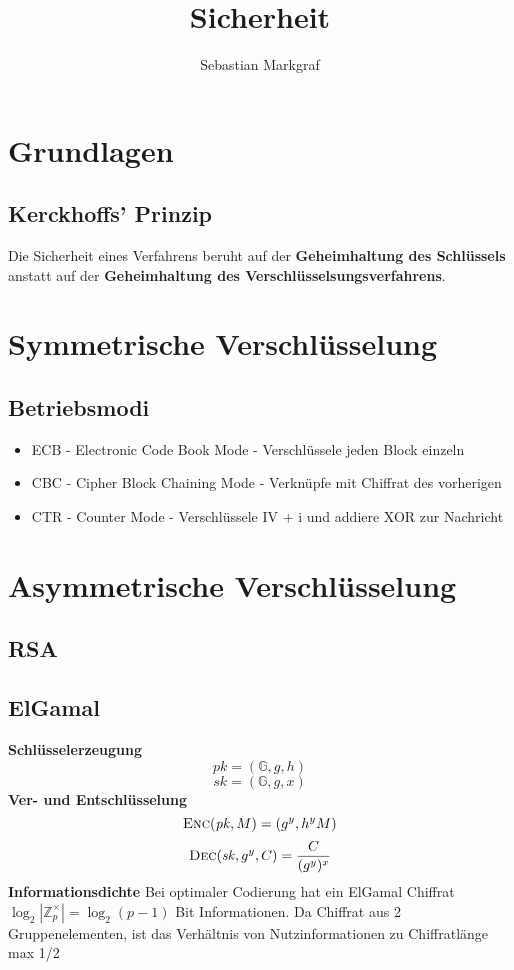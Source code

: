 \documentclass[10pt,a4paper]{article}
\author{Sebastian Markgraf}
\title{Sicherheit}
\begin{document}
	{\let\newpage\relax\maketitle}
	\tableofcontents
	\newpage
	\setcounter{page}{1}

        \section{Grundlagen}
        \subsection{Kerckhoffs' Prinzip}
        Die Sicherheit eines Verfahrens beruht auf der \textbf{Geheimhaltung des Schlüssels}
        anstatt auf der \textbf{Geheimhaltung des Verschlüsselsungsverfahrens}.
        
	\section{Symmetrische Verschlüsselung}
        \subsection{Betriebsmodi}
        \begin{itemize}
        \item ECB - Electronic Code Book Mode - Verschlüssele jeden Block einzeln
        \item CBC - Cipher Block Chaining Mode - Verknüpfe mit Chiffrat des vorherigen
        \item CTR - Counter Mode - Verschlüssele IV + i und addiere XOR zur Nachricht
        \end{itemize}

        \section{Asymmetrische Verschlüsselung}
        \subsection{RSA}
        \subsection{ElGamal}
        \textbf{Schlüsselerzeugung}
        \[\mathit{pk} = (\mathbb{G},g,h)\]
        \[\mathit{sk} = (\mathbb{G},g,x)\]
        \textbf{Ver- und Entschlüsselung}
        \[\textsc{Enc}(\mathit{pk}, M) = (g^y, h^yM)\]
        \[\textsc{Dec}(\mathit{sk}, g^y, C) = \frac{C}{(g^y)^x}\]
        \textbf{Informationsdichte}
        Bei optimaler Codierung hat ein ElGamal Chiffrat \(\log_2 | \mathbb{Z}_p^{\times}| = \log_2(p-1)\)
        Bit Informationen. Da Chiffrat aus 2 Gruppenelementen, ist das Verhältnis von Nutzinformationen zu Chiffratlänge max 1/2
        
\end{document}
